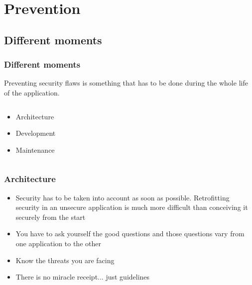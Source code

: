 \section{Prevention}

\begin{frame}
\sectionpage
\end{frame}

\subsection{Different moments}

\begin{frame}
\frametitle{Different moments}
Preventing security flaws is something that has to be done during the
whole life of the application.
\begin{columns}
\begin{column}{0.5\textwidth}
\begin{itemize}
\item Architecture
\item Development
\item Maintenance
\end{itemize}
\end{column}
\begin{column}{0.5\textwidth}
\end{column}
\end{columns}
\end{frame}

\begin{frame}
\frametitle{Architecture}
\begin{itemize}
\item Security has to be taken into account as soon as
  possible. Retrofitting security in an unsecure application is much
  more difficult than conceiving it securely from the start
\item You have to ask yourself the good questions and those questions
  vary from one application to the other
\item Know the threats you are facing
\item There is no miracle receipt... just guidelines
\end{itemize}
\end{frame}

